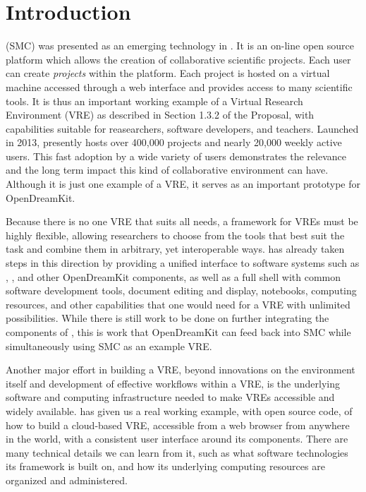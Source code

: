 \documentclass{deliverablereport}
\author{Erik Bray}
\begin{document}
\maketitle
%
\strut\githubissuedescription
\newpage\tableofcontents\newpage

\section{Introduction}

\SMC (SMC) was presented as an emerging technology in
. It is an on-line open source platform which allows
the creation of collaborative scientific projects. Each user can create
\emph{projects} within the platform. Each project is hosted on a \Linux virtual
machine accessed through a web interface and provides access to many scientific
tools.  It is thus an important working example of a Virtual Research
Environment (VRE) as described in Section 1.3.2 of the Proposal, with
capabilities suitable for reasearchers, software developers, and teachers.
Launched in 2013, \SMC presently hosts over 400,000 projects and nearly 20,000
weekly active users. This fast adoption by a wide variety of users demonstrates
the relevance and the long term impact this kind of collaborative environment
can have.  Although it is just one example of a VRE, it serves as an important
prototype for OpenDreamKit.

Because there is no one VRE that suits all needs, a framework for VREs must be
highly flexible, allowing researchers to choose from the tools that best suit
the task and combine them in arbitrary, yet interoperable ways.  \SMC has
already taken steps in this direction by providing a unified interface to
software systems such as \Sage, \GAP, and other OpenDreamKit components, as
well as a full \Linux shell with common software development tools, \LATEX
document editing and display, \Jupyter notebooks, computing resources, and
other capabilities that one would need for a VRE with unlimited possibilities.
While there is still work to be done on further integrating the components of
\SMC, this is work that OpenDreamKit can feed back into SMC while
simultaneously using SMC as an example VRE.

Another major effort in building a VRE, beyond innovations on the environment
itself and development of effective workflows within a VRE, is the underlying
software and computing infrastructure needed to make VREs accessible and widely
available.  \SMC has given us a real working example, with open source code, of
how to build a cloud-based VRE, accessible from a web browser from anywhere in
the world, with a consistent user interface around its components.  There are
many technical details we can learn from it, such as what software technologies
its framework is built on, and how its underlying computing resources are
organized and administered.
\end{document}
